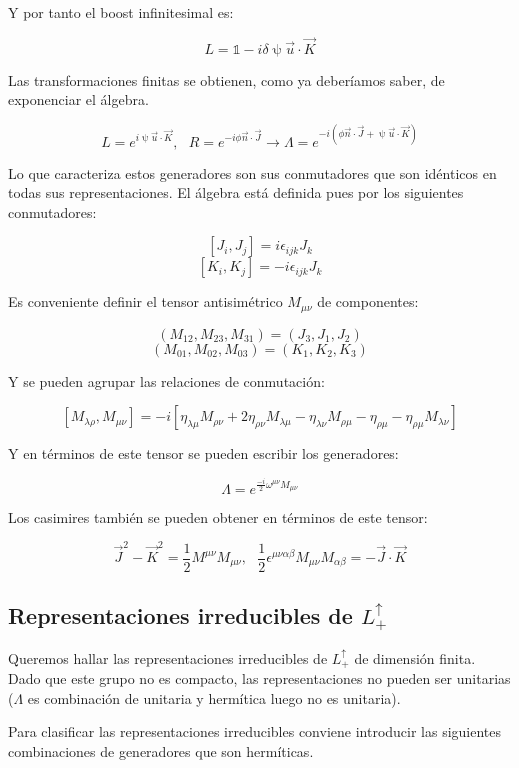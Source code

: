 \documentclass{article}
\begin{document}
Y por tanto el boost infinitesimal es:

$$L=\mathds{1}-i\delta \uppsi \Vec{u} \cdot \Vec{K}$$

\newpage

Las transformaciones finitas se obtienen, como ya deberíamos saber, de exponenciar el álgebra.

$$L=e^{i\uppsi \Vec{u} \cdot \Vec{K}}, \ \ \ R=e^{-i \phi \Vec{n} \cdot \Vec{J}} \longrightarrow \Lambda =e^{-i(\phi \Vec{n}\cdot \Vec{J} + \uppsi \Vec{u}\cdot \Vec{K})}$$

Lo que caracteriza estos generadores son sus conmutadores que son idénticos en todas sus representaciones. El álgebra está definida pues por los siguientes conmutadores:


$$[J_i,J_j]=i\epsilon _{ijk}J_k$$
$$[K_i,K_j]=-i\epsilon_{ijk}J_k$$

Es conveniente definir el tensor antisimétrico $M_{\mu \nu}$ de componentes:

$$(M_{12},M_{23},M_{31})=(J_3,J_1,J_2)$$
$$(M_{01},M_{02},M_{03})=(K_1,K_2,K_3)$$

Y se pueden agrupar las relaciones de conmutación:

$$[M_{\lambda \rho},M_{\mu \nu}]=-i[\eta_{\lambda \mu}M_{\rho \nu} + 2\eta _{\rho \nu} M_{\lambda \mu}-\eta _{\lambda \nu}M_{\rho \mu} - \eta_{\rho \mu}-\eta _{\rho \mu}M_{\lambda \nu} ]$$

Y en términos de este tensor se pueden escribir los generadores:

$$\Lambda = e^{\frac{-i}{2}\omega ^{\mu \nu} M_{\mu \nu}}$$

Los casimires también se pueden obtener en términos de este tensor:

$$\Vec{J}^2-\Vec{K}^2 = \frac{1}{2}M^{\mu \nu} M_{\mu \nu}, \ \ \ \frac{1}{2}\epsilon ^{\mu \nu \alpha \beta }M_{\mu \nu}M_{\alpha \beta}=-\Vec{J}\cdot \Vec{K}$$


\subsection{Representaciones irreducibles de $L^\uparrow _+$}

Queremos hallar las representaciones irreducibles de $L^\uparrow _+$ de dimensión finita. Dado que este grupo no es compacto, las representaciones no pueden ser unitarias ($\Lambda$ es combinación de unitaria y hermítica luego no es unitaria).

\smallskip
Para clasificar las representaciones irreducibles conviene introducir las siguientes combinaciones de generadores que son hermíticas.
\end{document}
